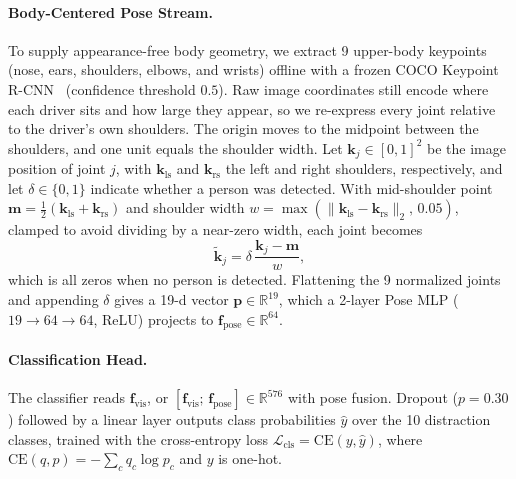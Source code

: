 \paragraph{Body-Centered Pose Stream.}
To supply appearance-free body geometry, we extract 9 upper-body keypoints (nose, ears, shoulders, elbows, and wrists) offline with a frozen COCO Keypoint R-CNN~\cite{he2017maskrcnn} (confidence threshold $0.5$). Raw image coordinates still encode where each driver sits and how large they appear, so we re-express every joint relative to the driver's own shoulders. The origin moves to the midpoint between the shoulders, and one unit equals the shoulder width. Let $\mathbf{k}_j \in [0, 1]^2$ be the image position of joint $j$, with $\mathbf{k}_{\text{ls}}$ and $\mathbf{k}_{\text{rs}}$ the left and right shoulders, respectively, and let $\delta \in \{0, 1\}$ indicate whether a person was detected. With mid-shoulder point $\mathbf{m} = \tfrac{1}{2}(\mathbf{k}_{\text{ls}} + \mathbf{k}_{\text{rs}})$ and shoulder width $w = \max(\|\mathbf{k}_{\text{ls}} - \mathbf{k}_{\text{rs}}\|_2,\, 0.05)$, clamped to avoid dividing by a near-zero width, each joint becomes
\begin{equation}
  \tilde{\mathbf{k}}_j = \delta \, \frac{\mathbf{k}_j - \mathbf{m}}{w},
  \label{eq:pose_norm}
\end{equation}
which is all zeros when no person is detected. Flattening the 9 normalized joints and appending $\delta$ gives a 19-d vector $\mathbf{p} \in \mathbb{R}^{19}$, which a 2-layer Pose MLP ($19 \!\to\! 64 \!\to\! 64$, ReLU) projects to $\mathbf{f}_{\text{pose}} \in \mathbb{R}^{64}$.

\paragraph{Classification Head.}
The classifier reads $\mathbf{f}_{\text{vis}}$, or $[\mathbf{f}_{\text{vis}};\, \mathbf{f}_{\text{pose}}] \in \mathbb{R}^{576}$ with pose fusion. Dropout ($p = 0.30$) followed by a linear layer outputs class probabilities $\hat{y}$ over the 10 distraction classes, trained with the cross-entropy loss $\mathcal{L}_{\text{cls}} = \mathrm{CE}(y, \hat{y})$, where $\mathrm{CE}(q, p) = -\sum_c q_c \log p_c$ and $y$ is one-hot.

